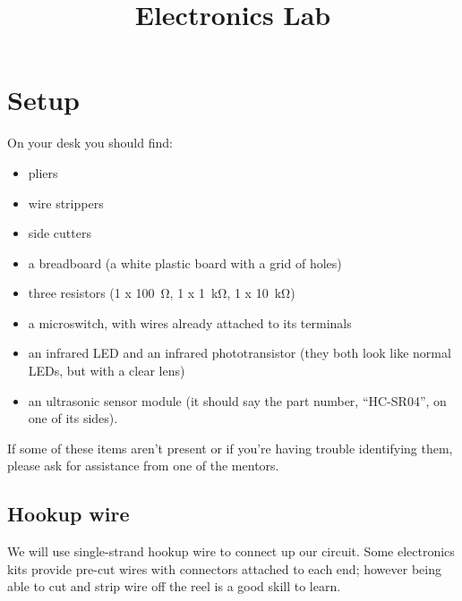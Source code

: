 \documentclass{article}
\title{Electronics Lab}
\begin{document}
\listoftodos
\newpage

\maketitle


\section{Setup}

On your desk you should find:

\begin{itemize}
\item pliers
\item wire strippers
\item side cutters
\item a breadboard (a white plastic board with a grid of holes)
\item three resistors (1 x \SI{100}{\ohm}, 1 x \SI{1}{\kilo\ohm},
1 x \SI{10}{\kilo\ohm})
\item a microswitch, with wires already attached to its terminals
\item an infrared LED and an infrared phototransistor (they both look like
normal LEDs, but with a clear lens) 
\item an ultrasonic sensor module (it should say the part number, ``HC-SR04'',
on one of its sides).
\end{itemize}


If some of these items aren't present or if you're having trouble identifying
them, please ask for assistance from one of the mentors.

\subsection{Hookup wire}

We will use single-strand hookup wire to connect up our circuit. Some
electronics kits provide pre-cut wires with connectors attached to each end;
however being able to cut and strip wire off the reel is a good skill to learn.
\end{document}
